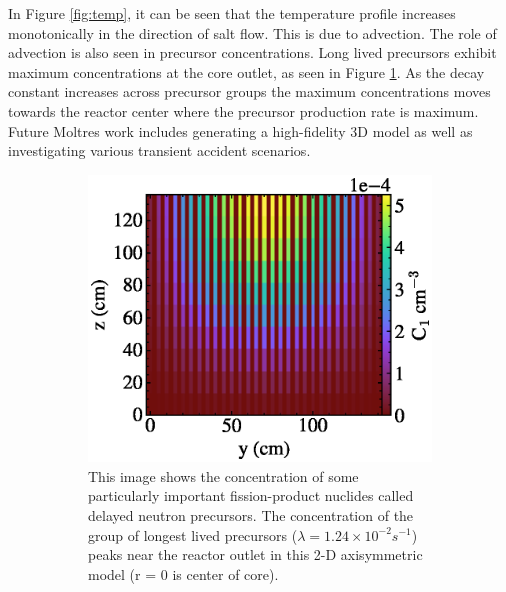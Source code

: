 \documentclass[letterpaper]{article}
\begin{document}
In Figure \ref{fig:temp}, it can be seen that the temperature profile increases monotonically in
the direction of salt flow. This is due to advection. 
The role of advection is also seen in precursor
concentrations. Long lived precursors exhibit maximum concentrations at the
core outlet, as seen in Figure \ref{fig:pre1}.  As the decay constant increases 
across precursor groups the maximum concentrations moves towards the reactor 
center where the precursor production rate is maximum. Future Moltres work 
includes generating a high-fidelity 3D model as well as investigating various 
transient accident scenarios.  



\begin{figure}[htb]
        \begin{subfigure}{0.4\textwidth}
        \begin{center}
                \includegraphics[width=\textwidth]{pre1.eps}
        \end{center}
        \caption{This image shows the concentration of some particularly 
        important fission-product nuclides called delayed neutron precursors.  
        The concentration of the group of longest lived precursors ($\lambda = 
        1.24\times{10}^{-2}{s}^{-1}$) peaks near the reactor outlet in this 2-D 
        axisymmetric model (r = 0 is center of core).} 
        \label{fig:pre1}
        \end{subfigure}\hfill%
        \begin{subfigure}{0.4\textwidth}

\end{subfigure}
\end{figure}
\end{document}
